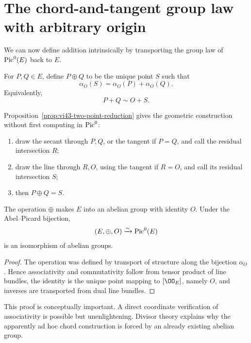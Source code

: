 

\section{The chord-and-tangent group law with arbitrary origin}

We can now define addition intrinsically by transporting the group law of \(\operatorname{Pic}^0(E)\) back to \(E\).

\begin{definition}\label{def:vi43-group-law}
For \(P,Q\in E\), define \(P\oplus Q\) to be the unique point \(S\) such that
\[
  \alpha_O(S)=\alpha_O(P)+\alpha_O(Q).
\]
Equivalently,
\[
  P+Q\sim O+S.
\]
\end{definition}

Proposition~\ref{prop:vi43-two-point-reduction} gives the geometric construction without first computing in \(\operatorname{Pic}^0\):
\begin{enumerate}
\item draw the secant through \(P,Q\), or the tangent if \(P=Q\), and call the residual intersection \(R\);
\item draw the line through \(R,O\), using the tangent if \(R=O\), and call its residual intersection \(S\);
\item then \(P\oplus Q=S\).
\end{enumerate}

\begin{theorem}\label{thm:vi43-group-law}
The operation \(\oplus\) makes \(E\) into an abelian group with identity \(O\).  Under the Abel--Picard bijection,
\[
  (E,\oplus,O)\xrightarrow{\sim}\operatorname{Pic}^0(E)
\]
is an isomorphism of abelian groups.
\end{theorem}

\begin{proof}
The operation was defined by transport of structure along the bijection \(\alpha_O\).  Hence associativity and commutativity follow from tensor product of line bundles, the identity is the unique point mapping to \([\OO_E]\), namely \(O\), and inverses are transported from dual line bundles.
\end{proof}

This proof is conceptually important.  A direct coordinate verification of associativity is possible but unenlightening.  Divisor theory explains why the apparently ad hoc chord construction is forced by an already existing abelian group.

